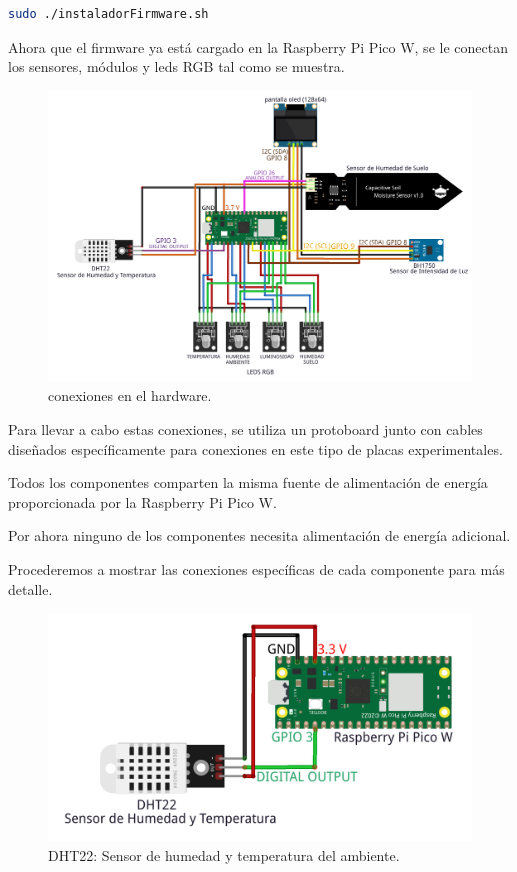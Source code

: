\begin{lstlisting}[language=sh, firstnumber=0, basicstyle=\normalsize, caption={Comando para ejecutar el instalador de Firmware.}] 
sudo ./instaladorFirmware.sh\end{lstlisting}

Ahora que el firmware ya está cargado en la Raspberry Pi Pico W, se le conectan los sensores, módulos y leds RGB tal como se muestra.

\begin{figure}[h]
	\centering
	\includegraphics[width=1\textwidth]{img/diagramas/conexiones_simple.png}
	\caption{conexiones en el hardware.}
\end{figure}

Para llevar a cabo estas conexiones, se utiliza un protoboard junto con cables diseñados específicamente para conexiones en este tipo de placas experimentales.

Todos los componentes comparten la misma fuente de alimentación de energía proporcionada por la Raspberry Pi Pico W.

Por ahora ninguno de los componentes necesita alimentación de energía adicional.

Procederemos a mostrar las conexiones específicas de cada componente para más detalle.

\begin{figure}[h]
	\centering
	\includegraphics[width=1\textwidth]{img/diagramas/DHT22.png}
	\caption{DHT22: Sensor de humedad y temperatura del ambiente.}
\end{figure}

